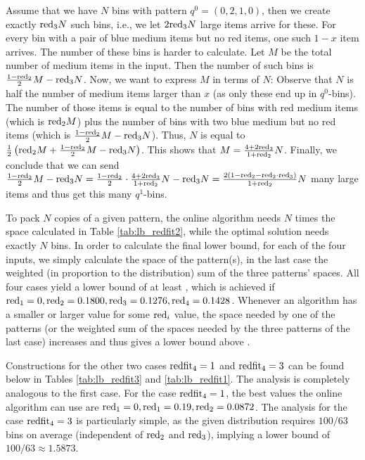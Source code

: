 Assume that we have $N$ bins with pattern $q^0=(0,2,1,0)$, then we create exactly $\mathrm{red}_3N$ such bins, i.e., we let $2\mathrm{red}_3N$ large items arrive for these.
For every bin with a pair of blue medium items but no red items, one such $1-x$ item arrives.
The number of these bins is harder to calculate. Let $M$ be the total number of medium items in the input. 
Then the number of such bins is $\frac{1-\mathrm{red}_2}{2}M-\mathrm{red}_3N$. Now, we want to express $M$ in terms of $N$: Observe that $N$ is half the number of medium items larger than $x$ (as only these end up in $q^0$-bins). The number of those items is equal to the number of bins with red medium items (which is $\mathrm{red}_2M$) plus the number of bins with two blue medium but no red items (which is $\frac{1-\mathrm{red}_2}{2}M-\mathrm{red}_3N$). Thus, $N$ is equal to $\frac{1}{2}\left( \mathrm{red}_2M + \frac{1-\mathrm{red}_2}{2}M-\mathrm{red}_3N \right)$. This shows that $M=\frac{4+2\mathrm{red}_3}{1+\mathrm{red}_2}N$. Finally, we conclude that we can send  $\frac{1-\mathrm{red}_2}{2}M-\mathrm{red}_3N = \frac{1-\mathrm{red}_2}{2}\cdot\frac{4+2\mathrm{red}_3}{1+\mathrm{red}_2}N-\mathrm{red}_3N=\frac{2(1-\mathrm{red}_2-\mathrm{red}_2\cdot\mathrm{red}_3)}{1+\mathrm{red}_2}N$ many large items and thus get this many $q^1$-bins. 

To pack $N$ copies of a given pattern, the online algorithm needs $N$
times the space calculated in Table \ref{tab:lb_redfit2}, while the optimal solution needs exactly $N$ bins. 
In order to calculate the final lower bound, for each of the four inputs, we simply calculate the space of the pattern(s), in the last case the weighted (in proportion to the distribution) sum of the three patterns' spaces. All four cases yield a lower bound of at least {\finallb}, which is achieved if $\mathrm{red}_1=0,\mathrm{red}_2=0.1800,\mathrm{red}_3=0.1276,\mathrm{red}_4=0.1428$.
Whenever an algorithm has a smaller or larger value for some $\mathrm{red}_i$ value, the space needed by one of the patterns (or the weighted sum of the spaces needed by the three patterns of the last case) increases and thus gives a lower bound above \finallb{}.

Constructions for the other two cases $\mathrm{redfit}_4=1$ and $\mathrm{redfit}_4=3$ can be found below in Tables \ref{tab:lb_redfit3} and \ref{tab:lb_redfit1}.
The analysis is completely analogous to the first case.
For the case $\mathrm{redfit}_4=1$, the best values the online algorithm can use are $\mathrm{red}_1=0,\mathrm{red}_1=0.19,\mathrm{red}_2=0.0872$.
The analysis for the case $\mathrm{redfit}_4=3$ is particularly simple, as the given distribution requires
$100/63$ bins on average (independent of $\mathrm{red}_2$ and $\mathrm{red}_3$), implying a lower bound of $100/63\approx1.5873$.

